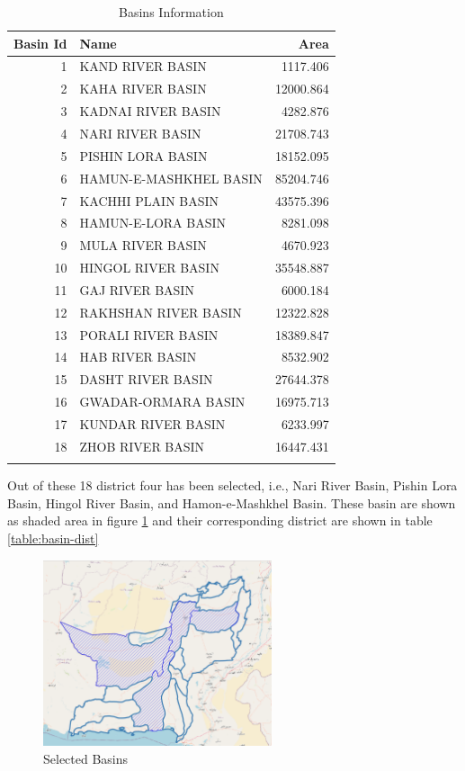 \begin{longtable}[H]{| r l r |}
    \hline
    Basin Id & Name                   & Area      \\
    \hline
    1        & KAND RIVER BASIN       & 1117.406  \\
    2        & KAHA RIVER BASIN       & 12000.864 \\
    3        & KADNAI RIVER BASIN     & 4282.876  \\
    4        & NARI RIVER BASIN       & 21708.743 \\
    5        & PISHIN LORA BASIN      & 18152.095 \\
    6        & HAMUN-E-MASHKHEL BASIN & 85204.746 \\
    7        & KACHHI PLAIN BASIN     & 43575.396 \\
    8        & HAMUN-E-LORA BASIN     & 8281.098  \\
    9        & MULA RIVER BASIN       & 4670.923  \\
    10       & HINGOL RIVER BASIN     & 35548.887 \\
    11       & GAJ RIVER BASIN        & 6000.184  \\
    12       & RAKHSHAN RIVER BASIN   & 12322.828 \\
    13       & PORALI RIVER BASIN     & 18389.847 \\
    14       & HAB RIVER BASIN        & 8532.902  \\
    15       & DASHT RIVER BASIN      & 27644.378 \\
    16       & GWADAR-ORMARA BASIN    & 16975.713 \\
    17       & KUNDAR RIVER BASIN     & 6233.997  \\
    18       & ZHOB RIVER BASIN       & 16447.431 \\
    \hline
    \caption{Basins Information}
    \label{table:basinInfo}
\end{longtable}

Out of these 18 district four has been selected, i.e.,  Nari River Basin, Pishin Lora Basin, Hingol River Basin, and Hamon-e-Mashkhel Basin.
These basin are shown as shaded area in figure \ref{fig:selBasins} and their corresponding district are shown in table \ref{table:basin-dist}

\begin{figure}[H]
    \centering
    \includegraphics[width=0.6\textwidth]{images/SelectedBasins.png}
    \caption{Selected Basins}\label{fig:selBasins}
\end{figure}

